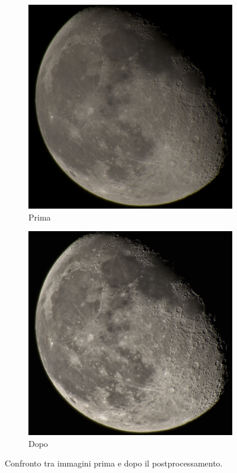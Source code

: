 \begin{figure}[H]
    \centering
    \begin{subfigure}[t]{0.49\textwidth}
        \centering
        \caption{Prima}
        \includegraphics[width=\linewidth]{../assets/stacked.png}
    \end{subfigure}
    \hfill
    \begin{subfigure}[t]{0.49\textwidth}
        \centering
        \caption{Dopo}
        \includegraphics[width=\linewidth]{../assets/unsharped.png}
    \end{subfigure}
    \caption{Confronto tra immagini prima e dopo il postprocessamento.}
    \label{fig:confronto-post}
\end{figure}

